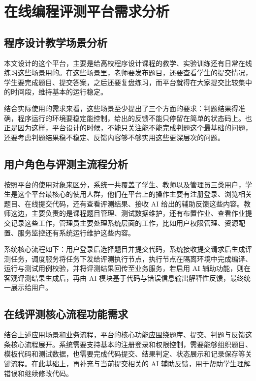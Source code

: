\chapter{在线编程评测平台需求分析}

\section{程序设计教学场景分析}

本文设计的这个平台，主要是给高校程序设计课程的教学、实验训练还有日常在线练习这些场景用的。在这些场景里，老师要发布题目，还要查看学生的提交情况，学生要完成题目、提交答案，之后还要复盘练习，而平台就得在大家提交比较集中的时间段，维持基本的运行稳定。

结合实际使用的需求来看，这些场景至少提出了三个方面的要求：判题结果得准确，程序运行的环境要稳定能控制，给出的反馈不能只停留在简单的状态码上。也正是因为这样，平台设计的时候，不能只关注能不能完成判题这个最基础的问题，还要考虑判题结果稳不稳定、反馈内容够不够实用这些更深层次的问题。

\section{用户角色与评测主流程分析}

按照平台的使用对象来区分，系统一共覆盖了学生、教师以及管理员三类用户，学生是这个平台最核心的使用人群，他们在平台上的操作主要有注册登录、浏览相关题目、在线提交代码，还有查看评测结果、接收 AI 给出的辅助反馈这些内容。教师这边，主要负责的是课程题目管理、测试数据维护，还有布置作业、查看作业提交记录这些工作，管理员主要处理系统层面的工作，比如用户权限管理、资源配置、服务监控还有系统运行维护这些内容。

系统核心流程如下：用户登录后选择题目并提交代码，系统接收提交请求后生成评测任务，调度服务将任务下发给评测执行节点，执行节点在隔离环境中完成编译、运行与测试用例校验，并将评测结果回传至业务服务，若启用 AI 辅助功能，则在客观评测结果生成后，再由 AI 模块基于代码与错误信息输出解释性反馈，最终统一展示给用户。

\section{在线评测核心流程功能需求}

结合上述应用场景和业务流程，平台的核心功能应围绕题库、提交、判题与反馈这条核心流程展开。系统需要支持基本的注册登录和权限控制，需要能够组织题目、模板代码和测试数据，也需要完成代码提交、结果判定、状态展示和记录保存等关键流程。在此基础上，再补充与当前提交相关的 AI 辅助反馈，用于帮助学生理解错误和继续修改代码。

